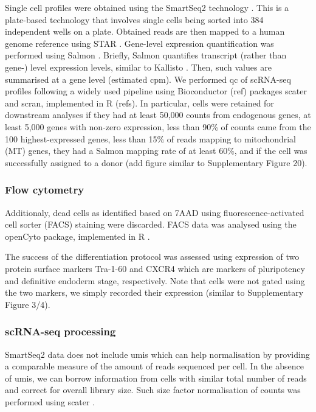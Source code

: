 Single cell profiles were obtained using the SmartSeq2 technology \cite{picelli2013smart}. 
This is a plate-based technology that involves single cells being sorted into 384 independent wells on a plate. 
Obtained reads are then mapped to a human genome reference using STAR \cite{dobin2013star}. 
Gene-level expression quantification was performed using Salmon \cite{patro2017salmon}. 
Briefly, Salmon quantifies transcript (rather than gene-) level expression levels, similar to Kallisto \cite{bray2016near}.
Then, such values are summarised at a gene level (estimated \gls{cpm}).
We performed \gls{qc} of scRNA-seq profiles following a widely used pipeline using Bioconductor (ref) packages scater \cite{mccarthy2017scater} and scran, implemented in R (refs).  
In particular, cells were retained for downstream analyses if they had at least 50,000 counts from endogenous genes, at least 5,000 genes with non-zero expression, less than 90\% of counts came from the 100 highest-expressed genes, less than 15\% of reads mapping to mitochondrial (MT) genes, they had a Salmon mapping rate of at least 60\%, and if the cell was successfully assigned to a donor (add figure similar to Supplementary Figure 20). 


\subsubsection{Flow cytometry}

Additionaly, dead cells as identified based on 7AAD using fluorescence-activated cell sorter (FACS) staining were discarded. 
FACS data was analysed using the openCyto package, implemented in R \cite{finak2014opencyto}. 


The success of the differentiation protocol was assessed using expression of two protein surface markers Tra-1-60 and CXCR4 which are markers of pluripotency and definitive endoderm stage, respectively. 
Note that cells were not gated using the two markers, we simply recorded their expression (similar to Supplementary Figure 3/4). 

\subsubsection{scRNA-seq processing}

SmartSeq2 data does not include \gls{umis} which can help normalisation by providing a comparable measure of the amount of reads sequenced per cell. 
In the absence of \gls{umis}, we can borrow information from cells with similar total number of reads and correct for overall library size. 
Such size factor normalisation of counts was performed using scater \cite{mccarthy2017scater}. 

